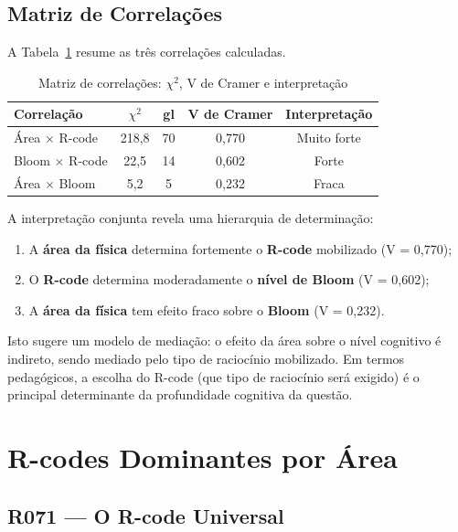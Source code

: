 \documentclass[12pt,a4paper]{article}
\begin{document}
\subsection{Matriz de Correlações}

A Tabela~\ref{tab:matriz_corr} resume as três correlações calculadas.

\begin{table}[H]
\centering
\caption{Matriz de correlações: $\chi^2$, V de Cramer e interpretação}
\label{tab:matriz_corr}
\begin{tabular}{lcccc}
\toprule
\textbf{Correlação} & $\chi^2$ & \textbf{gl} & \textbf{V de Cramer} & \textbf{Interpretação} \\
\midrule
Área $\times$ R-code & 218,8 & 70 & 0,770 & Muito forte \\
Bloom $\times$ R-code & 22,5 & 14 & 0,602 & Forte \\
Área $\times$ Bloom & 5,2 & 5 & 0,232 & Fraca \\
\bottomrule
\end{tabular}
\end{table}

A interpretação conjunta revela uma hierarquia de determinação:
\begin{enumerate}
  \item A \textbf{área da física} determina fortemente o \textbf{R-code}
    mobilizado (V = 0,770);
  \item O \textbf{R-code} determina moderadamente o \textbf{nível de Bloom}
    (V = 0,602);
  \item A \textbf{área da física} tem efeito fraco sobre o \textbf{Bloom}
    (V = 0,232).
\end{enumerate}

Isto sugere um modelo de mediação: o efeito da área sobre o nível
cognitivo é indireto, sendo mediado pelo tipo de raciocínio mobilizado.
Em termos pedagógicos, a escolha do R-code (que tipo de raciocínio
será exigido) é o principal determinante da profundidade cognitiva da
questão.

\section{R-codes Dominantes por Área}

\subsection{R071 --- O R-code Universal}
\end{document}
